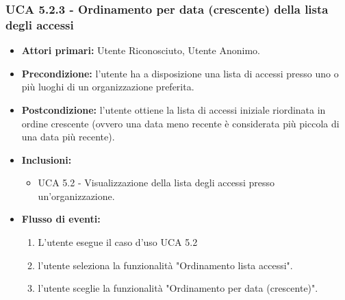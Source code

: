 \subsubsection{UCA 5.2.3 - Ordinamento per data (crescente) della lista degli accessi}
\begin{itemize}
    \item \textbf{Attori primari:} Utente Riconosciuto, Utente Anonimo.
    \item \textbf{Precondizione:} l’utente ha a disposizione una lista di accessi presso uno o più luoghi di un organizzazione preferita.
    \item \textbf{Postcondizione:} l’utente ottiene la lista di accessi iniziale riordinata in ordine crescente (ovvero una data meno recente è considerata più piccola di una data più recente).
    \item \textbf{Inclusioni:} %
    \begin{itemize}
        \item UCA 5.2 - Visualizzazione della lista degli accessi presso un'organizzazione.
    \end{itemize}
    \item \textbf{Flusso di eventi:}
    \begin{enumerate}
        \item L'utente esegue il caso d'uso UCA 5.2
        \item l'utente seleziona la funzionalità "Ordinamento lista accessi".
        \item l'utente sceglie la funzionalità "Ordinamento per data (crescente)".
    \end{enumerate}
\end{itemize}

